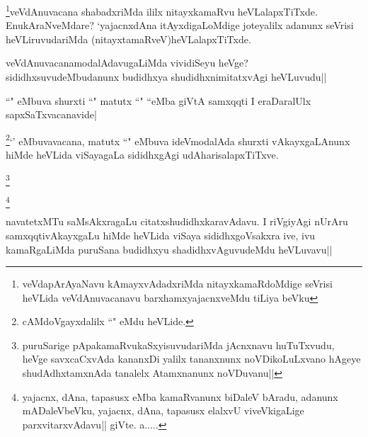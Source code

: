\begin{artha}
\footnote{veVdapArAyaNavu kAmayxvAdadxriMda nitayxkamaRdoMdige seVrisi heVLida 
veVdAnuvacanavu barxhamxyajacnxveMdu tiLiya beVku}veVdAnuvacana shabadxriMda ililx 
nitayxkamaRvu heVLalapxTiTxde. EnukAraNveMdare? 
`yajacnxdAna itAyxdigaLoMdige joteyalilx adanunx seVrisi heVLiruvudariMda 
(nitayxtamaRveV)heVLalapxTiTxde.
\end{artha}

\begin{artha}
veVdAnuvacanamodalAdavugaLiMda vividiSeyu heVge? sididhxsuvudeMbudanunx budidhxya shudidhxnimitatxvAgi heVLuvudu||
\end{artha}


\begin{artha}
``\stext" eMbuva shurxti ``\stext" matutx ``\stext" ``\stext eMba giVtA samxqqti I eraDaralUlx sapxSaTxvacanavide|
\end{artha}


\begin{artha}
\footnotemark\footnote{cAMdoVgayxdalilx ``\stext" eMdu heVLide.}`\stext' eMbuvavacana, matutx ``\stext" eMbuva ideVmodalAda shurxti vAkayxgaLAnunx hiMde heVLida viSayagaLa sididhxgAgi udAharisalapxTiTxve.
\end{artha}


\begin{artha}
\footnote{puruSarige pApakamaRvukaSxyisuvudariMda jAcnxnavu huTuTxvudu, heVge savxcaCxvAda kananxDi yalilx tananxnunx noVDikoLuLxvano hAgeye shudAdhxtamxnAda  tanalelx Atamxnanunx noVDuvanu||}
\end{artha}

\begin{artha}
\footnote{yajacnx, dAna, tapasusx eMba kamaRvanunx biDaleV bAradu, adanunx mADaleVbeVku, yajacnx, dAna, tapasusx elalxvU viveVkigaLige parxvitarxvAdavu|| giVte. a.....}
\end{artha}

\begin{artha}
navatetxMTu saMsAkxragaLu citatxshudidhxkaravAdavu. I riVgiyAgi nUrAru samxqqtivAkayxgaLu hiMde heVLida viSaya sididhxgoVsakxra ive, ivu kamaRgaLiMda puruSana budidhxyu shadidhxvAguvudeMdu heVLuvavu||
\end{artha}

